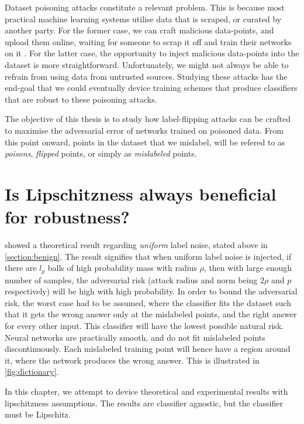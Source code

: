 \documentclass{ociamthesis}
\begin{document}
Dataset poisoning attacks constitute a relevant problem. This is because most
practical machine learning systems utilise data that is scraped, or curated by
another party. For the former case, we can craft malicious data-points, and
upload them online, waiting for someone to scrap it off and train their networks
on it \citep{transferable-clean-label-poisoning}. For the latter case, the
opportunity to inject malicious data-points into the dataset is more
straightforward. Unfortunately, we might not always be able to refrain from
using data from untrusted sources. Studying these attacks has the end-goal that
we could eventually device training schemes that produce classifiers that are
robust to these poisoning attacks.

The objective of this thesis is to study how label-flipping attacks can be
crafted to maximise the adversarial error of networks trained on poisoned data.
From this point onward, points in the dataset that we mislabel, will be refered
to as \emph{poisons}, \emph{flipped} points, or simply as \emph{mislabeled}
points.


\chapter{Is Lipschitzness always beneficial for robustness?}
\label{section:lipschitzness-assumption}

\citet{sanyal2021how} showed a theoretical result regarding \emph{uniform} label
noise, stated above in \cref{section:benign}. The result signifies that when
uniform label noise is injected, if there are $l_p$ balls of high probability
mass with radius $\rho$, then with large enough number of samples, the
adversarial risk (attack radius and norm being $2\rho$ and $p$ respectively)
will be high with high probability. In order to bound the adversarial risk, the
worst case had to be assumed, where the classifier fits the dataset such that it
gets the wrong answer only at the mislabeled points, and the right answer for
every other input. This classifier will have the lowest possible natural risk.
Neural networks are practically smooth, and do not fit mislabeled points
discontinuously. Each mislabeled training point will hence have a region around
it, where the network produces the wrong answer. This is illustrated in
\cref{fig:dictionary}.

In this chapter, we attempt to device theoretical and experimental results with
lipschitzness assumptions. The results are classifier agnostic, but the
classifier must be Lipschitz.
\end{document}
